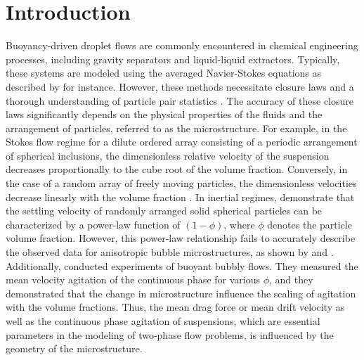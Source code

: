 \section{Introduction}


Buoyancy-driven droplet flows are commonly encountered in chemical engineering processes, including gravity separators and liquid-liquid extractors. Typically, these systems are modeled using the averaged Navier-Stokes equations as described by \citep{castellano2019} for instance. However, these methods necessitate closure laws and a thorough understanding of particle pair statistics \citep{simonin1996}. The accuracy of these closure laws significantly depends on the physical properties of the fluids and the arrangement of particles, referred to as the microstructure. %
For example, in the Stokes flow regime for a dilute ordered array consisting of a periodic arrangement of spherical inclusions, the dimensionless relative velocity of the suspension decreases proportionally to the cube root of the volume fraction. Conversely, in the case of a random array of freely moving particles, the dimensionless velocities decrease linearly with the volume fraction \citep{saffman1973}.
In inertial regimes, \citet{yin2007} demonstrate that the settling velocity of randomly arranged solid spherical particles can be characterized by a power-law function of $(1-\phi)$, where $\phi$ denotes the particle volume fraction.
However, this power-law relationship fails to accurately describe the observed data for anisotropic bubble microstructures, as shown by \citet{yin2008lattice} and \citet{loisy2017}.
Additionally, \citet{cartellier2009induced} conducted experiments of buoyant bubbly flows. 
They measured the mean velocity agitation of the continuous phase for various $\phi$, 
and they demonstrated that the change in microstructure influence the scaling of agitation with the volume fractions. 
Thus, the mean drag force or mean drift velocity as well as the continuous phase agitation of suspensions, which are essential parameters in the modeling of two-phase flow problems, is influenced by the geometry of the microstructure.



